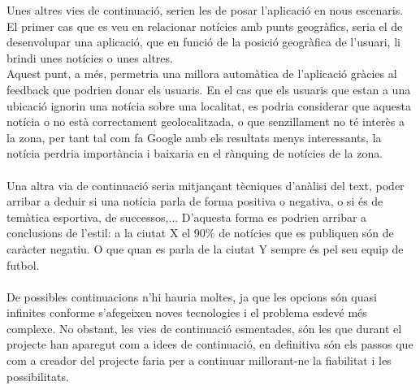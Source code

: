 \documentclass[12pt,a4paper,openright,oneside]{article}
\numberwithin{equation}{section}
\theoremstyle{definition}
\begin{document}
Unes altres vies de continuació, serien les de posar l'aplicació en nous escenaris. El primer cas que es veu en relacionar notícies amb punts geogràfics, seria el de desenvolupar una aplicació, que en funció de la posició geogràfica de l'usuari, li brindi unes notícies o unes altres.\\
Aquest punt, a més, permetria una millora automàtica de l'aplicació gràcies al feedback que podrien donar els usuaris. En el cas que els usuaris que estan a una ubicació ignorin una notícia sobre una localitat, es podria considerar que aquesta notícia o no està correctament geolocalitzada, o que senzillament no té interès a la zona, per tant tal com fa Google amb els resultats menys interessants, la notícia perdria importància i baixaria en el rànquing de notícies de la zona.\\\\
Una altra via de continuació seria mitjançant tècniques d'anàlisi del text, poder arribar a deduir si una notícia parla de forma positiva o negativa, o si és de temàtica esportiva, de successos,... D'aquesta forma es podrien arribar a conclusions de l'estil: a la ciutat X el 90\% de notícies que es publiquen són de caràcter negatiu. O que quan es parla de la ciutat Y sempre és pel seu equip de futbol.\\\\
De possibles continuacions n'hi hauria moltes, ja que les opcions són quasi infinites conforme s'afegeixen noves tecnologies i el problema esdevé més complexe. No obstant, les vies de continuació esmentades, són les que durant el projecte han aparegut com a idees de continuació, en definitiva són els passos que com a creador del projecte faria per a continuar millorant-ne la fiabilitat i les possibilitats.


\normalfont

\newpage
\end{document}
